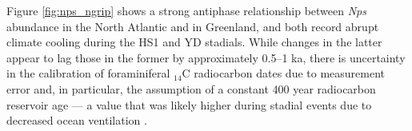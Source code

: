Figure \ref{fig:nps_ngrip} shows a strong antiphase relationship between \emph{Nps} abundance in the North Atlantic and \delO{} in Greenland, and both record abrupt climate cooling during the HS1 and YD stadials.
While changes in the latter appear to lag those in the former by approximately 0.5--1 ka, there is uncertainty in the calibration of foraminiferal $_{14}\mathrm{C}$ radiocarbon dates due to measurement error and, in particular, the assumption of a constant 400 year radiocarbon reservoir age --- a value that was likely higher during stadial events due to decreased ocean ventilation \parencite{bard1994north, hughen2004marine04}.
